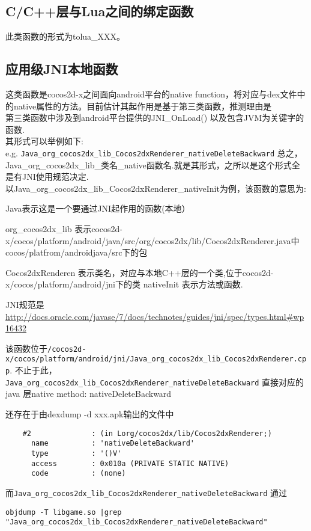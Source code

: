 \subsection{C/C++层与Lua之间的绑定函数}
\label{sec:so:bindlib}
此类函数的形式为tolua\_XXX。

\subsection{应用级JNI本地函数}
\label{sec:so:appjnilib}
这类函数是cocos2d-x之间面向android平台的native function，将对应与dex文件中的native属性的方法。目前估计其起作用是基于第三类函数，推测理由是\\第三类函数中涉及到android平台提供的JNI\_OnLoad()  以及包含JVM为关键字的函数.\\

其形式可以举例如下:\\
e.g.
\verb|Java_org_cocos2dx_lib_Cocos2dxRenderer_nativeDeleteBackward|
总之，Java\_org\_cocos2dx\_lib\_类名\_native函数名.就是其形式，之所以是这个形式全是有JNI使用规范决定.\\

以Java\_org\_cocos2dx\_lib\_Cocos2dxRenderer\_nativeInit为例，该函数的意思为:

Java表示这是一个要通过JNI起作用的函数(本地）

org\_cocos2dx\_lib  表示cocos2d-x/cocos/platform/android/java/src/org/cocos2dx/lib/Cocos2dxRenderer.java中cocos/platfrom/androidjava/src下的包

Cocos2dxRenderen 表示类名，对应与本地C++层的一个类,位于cocos2d-x/cocos/platform/android/jni下的类
nativeInit 表示方法或函数.

JNI规范是\url{http://docs.oracle.com/javase/7/docs/technotes/guides/jni/spec/types.html#wp16432}

该函数位于\verb|/cocos2d-x/cocos/platform/android/jni/Java_org_cocos2dx_lib_Cocos2dxRenderer.cpp|.
不止于此，
\verb|Java_org_cocos2dx_lib_Cocos2dxRenderer_nativeDeleteBackward|
直接对应的java 层native method: nativeDeleteBackward

还存在于由dexdump -d xxx.apk输出的文件中\\
\begin{lstlisting}
    #2              : (in Lorg/cocos2dx/lib/Cocos2dxRenderer;)
      name          : 'nativeDeleteBackward'
      type          : '()V'
      access        : 0x010a (PRIVATE STATIC NATIVE)
      code          : (none)
\end{lstlisting}

而\verb|Java_org_cocos2dx_lib_Cocos2dxRenderer_nativeDeleteBackward|
通过\\
\begin{lstlisting}
objdump -T libgame.so |grep "Java_org_cocos2dx_lib_Cocos2dxRenderer_nativeDeleteBackward"
\end{lstlisting}

